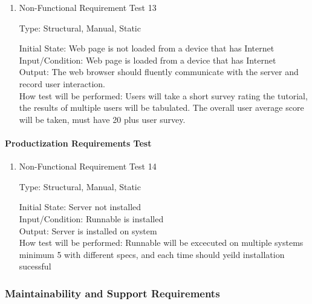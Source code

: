 \documentclass[12pt, titlepage]{article}
\begin{document}
\begin{enumerate}

\item{Non-Functional Requirement Test 13\\}

Type: Structural, Manual, Static
					
Initial State: Web page is not loaded from a device that has Internet \\
					
Input/Condition: Web page is loaded from a device that has Internet \\
					
Output: The web browser should fluently communicate with the server and record user interaction.  \\
					
How test will be performed: Users will take a short survey rating the tutorial, the results of multiple users will be
tabulated. The overall user average score will be taken, must have 20 plus user survey.    \\

\end{enumerate}

\paragraph{Productization Requirements Test}

\begin{enumerate}


\item{Non-Functional Requirement Test 14\\}

Type: Structural, Manual, Static
					
Initial State: Server not installed \\
					
Input/Condition: Runnable is installed \\
					
Output: Server is installed on system \\
					
How test will be performed: Runnable will be excecuted on multiple systems minimum 5 with different specs,
and each time should yeild installation sucessful \\
\end{enumerate}

\subsubsection{Maintainability and Support Requirements}
\end{document}
